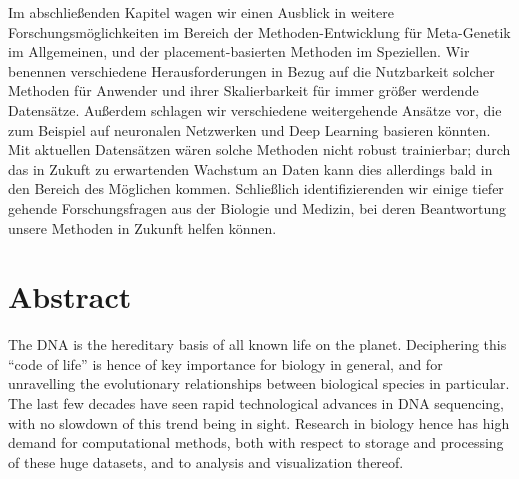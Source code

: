 Im abschlie\ss{}enden Kapitel wagen wir einen Ausblick in weitere Forschungsm\"oglichkeiten im Bereich der
Methoden-Entwicklung f\"ur Meta-Genetik im Allgemeinen, und der placement-basierten Methoden im Speziellen.
Wir benennen verschiedene Herausforderungen in Bezug auf die Nutzbarkeit solcher Methoden f\"ur Anwender
und ihrer Skalierbarkeit f\"ur immer gr\"o\ss{}er werdende Datens\"atze.
Au\ss{}erdem schlagen wir verschiedene weitergehende Ans\"atze vor,
die zum Beispiel auf neuronalen Netzwerken und Deep Learning basieren k\"onnten.
Mit aktuellen Datens\"atzen w\"aren solche Methoden nicht robust trainierbar;
durch das in Zukuft zu erwartenden Wachstum an Daten kann dies allerdings bald in den Bereich des M\"oglichen kommen.
Schlie\ss{}lich identifizierenden wir einige tiefer gehende Forschungsfragen aus der Biologie und Medizin,
bei deren Beantwortung unsere Methoden in Zukunft helfen k\"onnen.

\blankpage

\section*{Abstract}
\vspace*{1em}

The DNA is the hereditary basis of all known life on the planet.
Deciphering this ``code of life'' is hence of key importance for biology in general,
and for unravelling the evolutionary relationships between biological species in particular.
The last few decades have seen rapid technological advances in DNA sequencing,
with no slowdown of this trend being in sight.
Research in biology hence has high demand for computational methods,
both with respect to storage and processing of these huge datasets,
and to analysis and visualization thereof.

